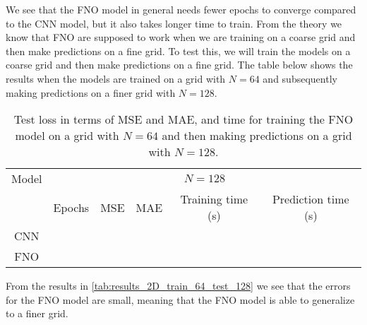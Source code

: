 We see that the FNO model in general needs fewer epochs to converge compared to the CNN model, but it also takes longer time to train.
From the theory we know that FNO are supposed to work when we are training on a coarse grid and then make predictions on a fine grid.
To test this, we will train the models on a coarse grid and then make predictions on a fine grid.
The table below shows the results when the models are trained on a grid with $N = 64$ and subsequently making predictions on a finer grid with $N = 128$.
\begin{table}[H]
    \centering
    \begin{tabular}{c|ccccc}
        Model & \multicolumn{5}{c}{$N = 128$} \\
        \cline{2-6}
        & Epochs & MSE & MAE & Training time (s) & Prediction time (s) \\
        \hline
        CNN &
         &
         &
         &
         &
         \\
        FNO  &
         &
         &
         &
         &
         
    \end{tabular}
    \caption{Test loss in terms of MSE and MAE, and time for training the FNO model on a grid with $N = 64$ and then making predictions on a grid with $N = 128$.}\label{tab:results_2D_train_64_test_128}
\end{table}
From the results in \autoref{tab:results_2D_train_64_test_128} we see that the errors for the FNO model are small, meaning that the FNO model is able to generalize to a finer grid.
